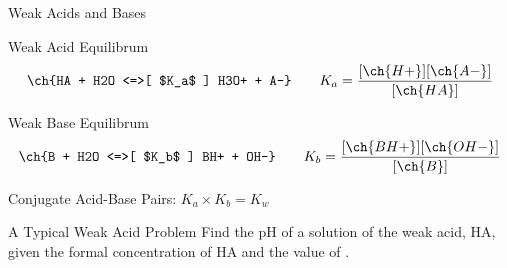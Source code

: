 \documentclass[notes=hide]{beamer}
\begin{document}
\begin{frame}{Weak Acids and Bases}
	\begin{block}{Weak Acid Equilibrum}
		\begin{align*}
			\ch{HA + H2O <=>[ $K_a$ ] H3O+ + A-} \qquad K_a =
			\dfrac{[\ch{H+}][\ch{A-}]}{[\ch{HA}]}
		\end{align*}
	\end{block}

	\begin{block}{Weak Base Equilibrum}
		\begin{align*}
			\ch{B + H2O <=>[ $K_b$ ] BH+ + OH-} \qquad K_b =
			\dfrac{[\ch{BH+}][\ch{OH-}]}{[\ch{B}]}
		\end{align*}
	\end{block}

	Conjugate Acid-Base Pairs: $K_a \times K_b = K_w$
\end{frame}


\begin{frame}[t]{A Typical Weak Acid Problem}
	Find the pH of a solution of the weak acid, HA, given the formal
	concentration of HA and the value of \Ka.


\end{frame}
\end{document}
